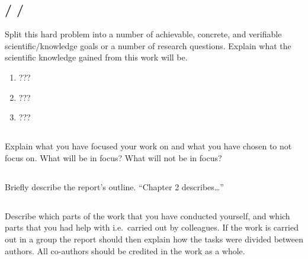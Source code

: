 \subsection{/
            /
            }\label{subsec:researchquestion}

Split this hard problem into a number of achievable, concrete, and verifiable
scientific/knowledge goals or a number of research questions. Explain what the
scientific knowledge gained from this work will be.
\begin{enumerate}
  \item ???
  \item ???
  \item ???
\end{enumerate}

\subsection{}\label{subsec:scope}
\noindent
Explain what you have focused your work on and what you have chosen to not focus
on. What will be in focus? What will not be in focus?

\subsection{}\label{subsec:outline}
\noindent
Briefly describe the report's outline. ``Chapter 2 describes\dots''

\subsection{}\label{subsec:contributions}
\noindent 
Describe which parts of the work that you have conducted yourself, and which
parts that you had help with i.e.\ carried out by colleagues. If the work is
carried out in a group the report should then explain how the tasks were divided
between authors. All co-authors should be credited in the work as a whole.
